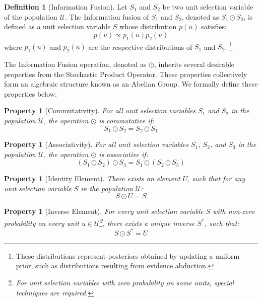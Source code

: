 \documentclass[letterpaper]{article} %
\newtheorem{property}[theorem]{Property}
\theoremstyle{definition}
\newtheorem{definition}[theorem]{Definition}
\theoremstyle{remark}
\begin{document}
\begin{definition}[Information Fusion]
\label{def:infoagg}
Let \( S_1 \) and \( S_2 \) be two unit selection variable of the population $\mathcal{U}$. The Information fusion of \( S_1 \) and \( S_2 \), denoted as \( S_1 \odot S_2 \), is defined as a unit selection variable \( S \) whose distribution $p(u)$ satisfies:
\begin{equation}
\label{eq:infoagg}
    p(u) \propto p_{1}(u) p_{2}(u)
\end{equation}
where $p_{1}(u)$ and $p_{2}(u)$ are the respective distributions of $S_1$ and $S_2$. \footnote{These distributions represent posteriors obtained by updating a uniform prior, such as distributions resulting from evidence abduction.}
\end{definition}

The Information Fusion operation, denoted as $\odot$, inherits several desirable properties from the Stochastic Product Operator. These properties collectively form an algebraic structure known as an Abelian Group. We formally define these properties below:

\begin{property}[Commutativity]
For all unit selection variables $S_1$ and $S_2$ in the population $\mathcal{U}$, the operation $\odot$ is commutative if:
\begin{equation}
    S_1 \odot S_2 = S_2 \odot S_1
\end{equation}
\end{property}

\begin{property}[Associativity]
For all unit selection variables $S_1$, $S_2$, and $S_3$ in the population $\mathcal{U}$, the operation $\odot$ is associative if:
\begin{equation}
    (S_1 \odot S_2) \odot S_3 = S_1 \odot (S_2 \odot S_3)
\end{equation}
\end{property}

\begin{property}[Identity Element]
\label{property:identity}
There exists an element $U$, such that for any unit selection variable $S$ in the population $\mathcal{U}$:
\begin{equation}
    S \odot U = S
\end{equation}
\end{property}

\begin{property}[Inverse Element]
\label{property:inverse}
For every unit selection variable $S$ with non-zero probability on every unit $u \in \mathcal{U}$\footnote{For unit selection variables with zero probability on some units, special techniques are required.}, there exists a unique inverse $S^*$, such that:
\begin{equation}
    S \odot S^* = U
\end{equation}
\end{property}
\end{document}
